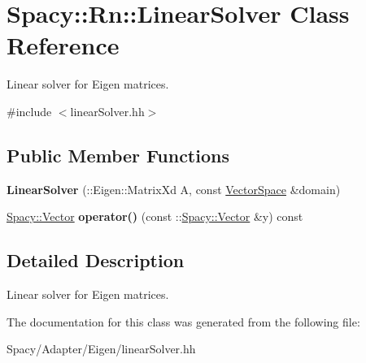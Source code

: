 \hypertarget{classSpacy_1_1Rn_1_1LinearSolver}{}\section{Spacy\+:\+:Rn\+:\+:Linear\+Solver Class Reference}
\label{classSpacy_1_1Rn_1_1LinearSolver}


Linear solver for Eigen matrices.  




{\ttfamily \#include $<$linear\+Solver.\+hh$>$}

\subsection*{Public Member Functions}
\begin{DoxyCompactItemize}
\item 
\hypertarget{classSpacy_1_1Rn_1_1LinearSolver_ac50d2a63149b336622ecd4114d2cfe5a}{}{\bfseries Linear\+Solver} (\+::Eigen\+::\+Matrix\+Xd A, const \hyperlink{classSpacy_1_1VectorSpace}{Vector\+Space} \&domain)\label{classSpacy_1_1Rn_1_1LinearSolver_ac50d2a63149b336622ecd4114d2cfe5a}

\item 
\hypertarget{classSpacy_1_1Rn_1_1LinearSolver_a11483b4db3dd9f91ffbcea121c0eadd4}{}\hyperlink{classSpacy_1_1Vector}{Spacy\+::\+Vector} {\bfseries operator()} (const \+::\hyperlink{classSpacy_1_1Vector}{Spacy\+::\+Vector} \&y) const \label{classSpacy_1_1Rn_1_1LinearSolver_a11483b4db3dd9f91ffbcea121c0eadd4}

\end{DoxyCompactItemize}


\subsection{Detailed Description}
Linear solver for Eigen matrices. 

The documentation for this class was generated from the following file\+:\begin{DoxyCompactItemize}
\item 
Spacy/\+Adapter/\+Eigen/linear\+Solver.\+hh\end{DoxyCompactItemize}
